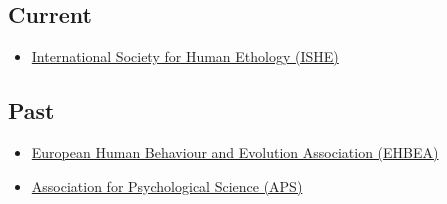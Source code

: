 \documentclass[11pt,a4paper,]{awesome-cv}
\providecommand{\tightlist}{%
	\setlength{\itemsep}{0pt}\setlength{\parskip}{0pt}}
\begin{document}
\hypertarget{section-3}{%
\subsection{\texorpdfstring{\textbf{Current}}{}}\label{section-3}}

\begin{itemize}
\tightlist
\item
  \href{https://ishe.org/}{International Society for Human Ethology
  (ISHE)}
\end{itemize}

\hypertarget{section-4}{%
\subsection{\texorpdfstring{\textbf{Past}}{}}\label{section-4}}

\begin{itemize}
\tightlist
\item
  \href{https://www.cambridge.org/core/membership/ehbea}{European Human
  Behaviour and Evolution Association (EHBEA)}
\item
  \href{https://www.psychologicalscience.org/}{Association for
  Psychological Science (APS)}
\end{itemize}
\end{document}
